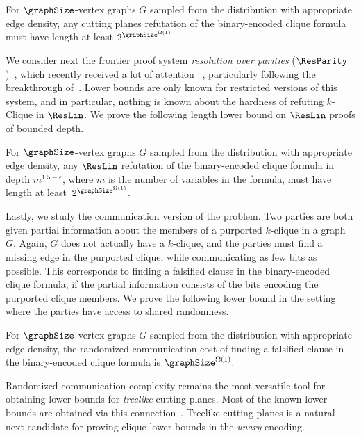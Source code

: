 \begin{theorem}[Informal]\label{thm:CP-informal}
    For $\graphSize$-vertex graphs $G$ sampled from the \erdosrenyi distribution with appropriate edge density, any cutting planes refutation of the binary-encoded clique formula must have length at least $2^{\graphSize^{\Omega(1)}}$.
\end{theorem}

We consider next the frontier proof system \emph{resolution over parities} ($\ResParity$)~\cite{IS20ResLin},
which recently received a lot of attention~
\cite{BhattacharyaCD24,AI25lifting,EI25amortized,BC25exponential,BI25bphp}, particularly following the breakthrough of~\cite{EGI24regular}.
Lower bounds are only known for restricted versions of this system, and in particular,
nothing is known about the hardness of refuting $k$-\textsf{Clique} in $\ResLin$.
We prove the following length lower bound on $\ResLin$ proofs of bounded depth.
\begin{theorem}[Informal]\label{thm:ResLin-informal}
    For $\graphSize$-vertex graphs $G$ sampled from the \erdosrenyi distribution with appropriate edge density,
    any $\ResLin$ refutation of the binary-encoded clique formula in depth $m^{1.5-\varepsilon}$, where $m$ is the number of variables in the formula, must have length at least~$2^{\graphSize^{\Omega(1)}}$.
\end{theorem}

Lastly, we study the communication version of the problem. 
Two parties are both given partial information about the members of a purported $k$-clique in a graph $G$.
Again, $G$ does not actually have a $k$-clique, and the parties must find a missing edge 
in
the purported clique, while communicating as few bits as possible.
This corresponds to finding a falsified clause in the binary-encoded clique formula, if the partial information consists of the bits encoding the purported clique members.
We prove the following lower bound
in the setting where the parties have access to shared randomness.

\begin{theorem}[Informal]\label{thm:Comm-informal}
    For $\graphSize$-vertex graphs $G$ sampled from the \erdosrenyi distribution with appropriate edge density, the randomized communication cost of finding a falsified clause in the binary-encoded clique formula is $\graphSize^{\Omega(1)}$.
\end{theorem}
Randomized communication complexity remains the most versatile tool for obtaining lower bounds for \emph{treelike} cutting planes. Most of the known lower bounds are obtained via this connection~\cite{IPU94Treelike,BPS07LS,HuynhN12,GP18CommunicationLowerBounds,IR21}. 
Treelike cutting planes is a natural next candidate for proving clique lower bounds in the \emph{unary} encoding.

